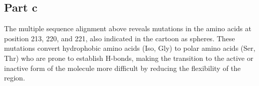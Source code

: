 \documentclass[11pt, a4paper,titlepage]{article}
\begin{document}
\subsection*{Part c}
The multiple sequence alignment above reveals mutations in the amino
acids at position 213, 220, and 221, also indicated in the cartoon as
spheres. These mutations convert hydrophobic amino acids (Iso, Gly) to
polar amino acids (Ser, Thr) who are prone to establish H-bonds,
making the transition to the active or inactive form of the molecule
more difficult by reducing the flexibility of the region.

 
\end{document}
